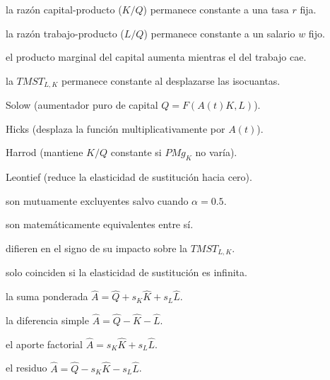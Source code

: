 \begin{opts}
    \item la razón capital-producto ($K/Q$) permanece constante a una tasa $r$ fija.
    \item la razón trabajo-producto ($L/Q$) permanece constante a un salario $w$ fijo.
    \item el producto marginal del capital aumenta mientras el del trabajo cae.
    \item la $TMST_{L,K}$ permanece constante al desplazarse las isocuantas.
\end{opts}

\begin{opts}
    \item Solow (aumentador puro de capital $Q = F(A(t)K, L)$).
    \item Hicks (desplaza la función multiplicativamente por $A(t)$).
    \item Harrod (mantiene $K/Q$ constante si $PMg_K$ no varía).
    \item Leontief (reduce la elasticidad de sustitución hacia cero).
\end{opts}

\begin{opts}
    \item son mutuamente excluyentes salvo cuando $\alpha = 0.5$.
    \item son matemáticamente equivalentes entre sí.
    \item difieren en el signo de su impacto sobre la $TMST_{L,K}$.
    \item solo coinciden si la elasticidad de sustitución es infinita.
\end{opts}

\begin{opts}
    \item la suma ponderada $\hat{A} = \hat{Q} + s_K \hat{K} + s_L \hat{L}$.
    \item la diferencia simple $\hat{A} = \hat{Q} - \hat{K} - \hat{L}$.
    \item el aporte factorial $\hat{A} = s_K \hat{K} + s_L \hat{L}$.
    \item el residuo $\hat{A} = \hat{Q} - s_K \hat{K} - s_L \hat{L}$.
\end{opts}

